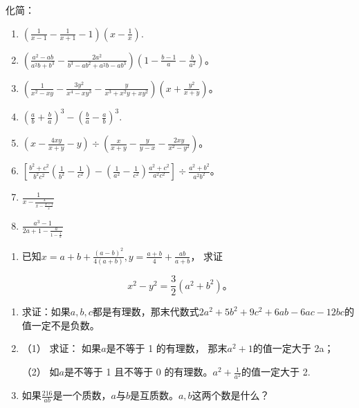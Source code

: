 化简：

\begin{enumerate}[start=31]
\item
  \(\left(\frac{1}{x - 1} -\frac{1}{x + 1} -1\right)(x - \frac{1}{x}).\)
\item
  \(\left(\frac{a^2 - ab}{a^2b + b^3} - \frac{2a^2}{b^3 - ab^2 + a^2b - ab^3}\right)\left(1 - \frac{b - 1}{a} - \frac{b}{a^2}\right)\)。
\item
  \(\left(\frac{1}{x^2 - xy} - \frac{3y^2}{x^4 - xy^3} - \frac{y}{x^3 + x^2y + xy^2}\right)\left(x + \frac{y^2}{x + y}\right)\)。
\item
  \(\left(\frac{a}{b} +\frac{b}{a}\right)^3 -\left(\frac{b}{a} -\frac{a}{b}\right)^3.\)
\item
  \(\left(x - \frac{4xy}{x + y} - y\right) \div \left(\frac{x}{x + y} - \frac{y}{y - x} - \frac{2xy}{x^2 - y^2}\right)\)。
\item
  \(\left[\frac{b^2 + c^2}{b^2c^2}\left(\frac{1}{b^2} - \frac{1}{c^2}\right) - \left(\frac{1}{a^2} - \frac{1}{c^2}\right)\frac{a^2 + c^2}{a^2c^2}\right] \div \frac{a^2 + b^2}{a^2b^2}\)。
\item
  \(\frac{1}{x - \frac{x}{x - \frac{x - 1}{x}}}\)
\item
  \(\frac{a^3 - 1}{2a + 1 - \frac{a}{1 - \frac{1}{a}}}\)
\end{enumerate}

\begin{enumerate}[start=39]
\item
  已知\(x = a + b + \frac{(a - b)^2}{4(a + b)}, y = \frac{a + b}{4} + \frac{ab}{a + b}\)，
  求证
\end{enumerate}

\[
x ^{2} - y ^{2} = \frac{3}{2} (a ^{2} + b ^{2})\text{。}
\]

\begin{enumerate}[start=40,label={*\arabic*.}]
\item
  求证：如果\(a, b, c\)都是有理数，那末代数式\(2a^2 + 5b^2 + 9c^2 + 6ab - 6ac - 12bc\)的值一定不是负数。

\item
  （1） 求证： 如果\(a\)是不等于 1 的有理数，
那末\(a^2 + 1\)的值一定大于 2a；

（2） 如\(a\)是不等于 1 且不等于 0
的有理数。\(a^2 + \frac{1}{a^2}\)的值一定大于 2.

\item
  如果\(\frac{216}{ab}\)是一个质数，\(a\)与\(b\)是互质数。\(a, b\)这两个数是什么？

\end{enumerate}
